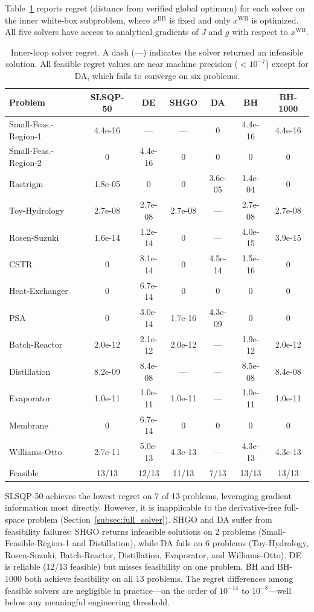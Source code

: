 \documentclass[12pt,a4paper]{article}%
\theoremstyle{plain}%
\theoremstyle{remark}%
\theoremstyle{definition}%
\def\WB{\mathrm{WB}}
\def\BB{\mathrm{BB}}
\begin{document}
\begin{appendices}
Table~\ref{tab:inner_regret} reports regret (distance from verified global optimum) for each solver on the inner white-box subproblem, where $x^{\BB}$ is fixed and only $x^{\WB}$ is optimized. All five solvers have access to analytical gradients of $J$ and $g$ with respect to $x^{\WB}$.

\begin{table}[htbp]
\centering
\caption{Inner-loop solver regret. A dash (---) indicates the solver returned an infeasible solution. All feasible regret values are near machine precision ($<10^{-7}$) except for DA, which fails to converge on six problems.}
\label{tab:inner_regret}
\footnotesize
\begin{tabular}{@{}lcccccc@{}}
\toprule
\textbf{Problem} & \textbf{SLSQP-50} & \textbf{DE} & \textbf{SHGO} & \textbf{DA} & \textbf{BH} & \textbf{BH-1000} \\
\midrule
Small-Feas.-Region-1 & 4.4e-16 & --- & --- & 0 & 4.4e-16 & 4.4e-16 \\
Small-Feas.-Region-2 & 0 & 4.4e-16 & 0 & 0 & 0 & 0 \\
Rastrigin & 1.8e-05 & 0 & 0 & 3.6e-05 & 1.4e-04 & 0 \\
Toy-Hydrology & 2.7e-08 & 2.7e-08 & 2.7e-08 & --- & 2.7e-08 & 2.7e-08 \\
Rosen-Suzuki & 1.6e-14 & 1.2e-14 & 0 & --- & 4.0e-15 & 3.9e-15 \\
CSTR & 0 & 8.1e-14 & 0 & 4.5e-14 & 1.5e-16 & 0 \\
Heat-Exchanger & 0 & 6.7e-14 & 0 & 0 & 0 & 0 \\
PSA & 0 & 3.0e-14 & 1.7e-16 & 4.3e-09 & 0 & 0 \\
Batch-Reactor & 2.0e-12 & 2.1e-12 & 2.0e-12 & --- & 1.9e-12 & 2.0e-12 \\
Distillation & 8.2e-09 & 8.4e-08 & --- & --- & 8.5e-08 & 8.4e-08 \\
Evaporator & 1.0e-11 & 1.0e-11 & 1.0e-11 & --- & 1.0e-11 & 1.0e-11 \\
Membrane & 0 & 6.7e-14 & 0 & 0 & 0 & 0 \\
Williams-Otto & 2.7e-11 & 5.0e-13 & 4.3e-13 & --- & 4.3e-13 & 4.3e-13 \\
\midrule
Feasible & 13/13 & 12/13 & 11/13 & 7/13 & 13/13 & 13/13 \\
\bottomrule
\end{tabular}
\end{table}

SLSQP-50 achieves the lowest regret on 7 of 13 problems, leveraging gradient information most directly. However, it is inapplicable to the derivative-free full-space problem (Section~\ref{subsec:full_solver}). SHGO and DA suffer from feasibility failures: SHGO returns infeasible solutions on 2 problems (Small-Feasible-Region-1 and Distillation), while DA fails on 6 problems (Toy-Hydrology, Rosen-Suzuki, Batch-Reactor, Distillation, Evaporator, and Williams-Otto). DE is reliable (12/13 feasible) but misses feasibility on one problem. BH and BH-1000 both achieve feasibility on all 13 problems. The regret differences among feasible solvers are negligible in practice---on the order of $10^{-14}$ to $10^{-8}$---well below any meaningful engineering threshold.


\end{appendices}
\end{document}
